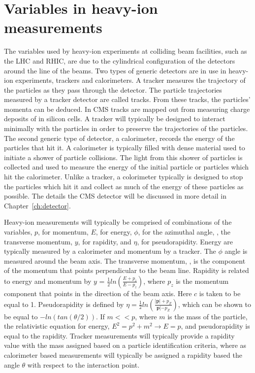   \section{Variables in heavy-ion measurements}
    The variables used by heavy-ion experiments at colliding beam facilities, 
      such as the LHC and RHIC, are due to the cylindrical configuration of 
      the detectors around the line of the beams.
    Two types of generic detectors are in use in heavy-ion experiments, 
      trackers and calorimeters. 
    A tracker measures the trajectory of the particles as they pass through 
      the detector.
    The particle trajectories measured by a tracker detector are called 
      tracks.
    From these tracks, the particles' momenta can be deduced. 
    In CMS tracks are mapped out from measuring charge deposits of in silicon
      cells.
    A tracker will typically be designed to interact minimally with the 
      particles in order to preserve the trajectories of the particles. 
    The second generic type of detector, a calorimeter, records the energy 
      of the particles that hit it. 
    A calorimeter is typically filled with dense material used to initiate a 
      shower of particle collisions.
    The light from this shower of particles is collected and used to measure 
      the energy of the initial particle or particles which hit the 
      calorimeter.
    Unlike a tracker, a colorimeter typically is designed to stop the particles
      which hit it and collect as much of the energy of these particles as 
      possible.
    The details the CMS detector will be discussed in more detail in 
     Chapter~\ref{ch:detector}.

    Heavy-ion measurements will typically be comprised of 
      combinations of the variables, $p$, for momentum, $E$, for energy, 
      $\phi$, for the azimuthal angle, \pt, the transverse momentum, $y$, 
      for rapidity, and $\eta$, for pseudorapidity. 
    Energy are typically measured by a calorimeter and momentum by a tracker.
    The $\phi$ angle is measured around the beam axis. 
    The transverse momentum, \pt, is the component of the momentum that points
      perpendicular to the beam line. 
    Rapidity is related to energy and momentum by 
    $y$ = $\frac{1}{2}ln\left(\frac{E+p_{z}}{E-p_{z}}\right)$, where $p_{z}$ 
      is the momentum component that points in the direction of the beam axis. 
    Here $c$ is taken to be equal to 1. 
    Pseudorapidity is defined by
      $\eta=\frac{1}{2}ln\left(\frac{|\mathbf{p}|+p_{Z}}{\mathbf{p}|-p_{Z}}\right)$, 
      which can be shown to be equal to $-ln\left(tan\left(\theta/2\right)\right)$.
    If $m << p$, where $m$ is the mass of the particle, the 
      relativistic equation for energy, $E^2=p^2+m^2 \rightarrow E=p$, and 
      pseudorapidity is equal to the rapidity. 
    Tracker measurements will typically provide a rapidity value with 
      the mass assigned based on a particle identification criteria, where as 
      calorimeter based measurements will typically be assigned a rapidity 
      based the angle $\theta$ with respect to the interaction point.

